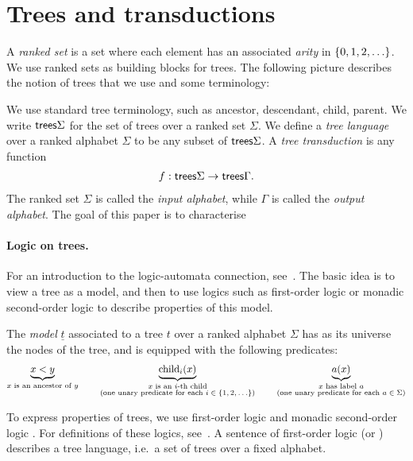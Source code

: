 \section{Trees and transductions}
\label{sec:trees-transductions}
A \emph{ranked set} is a set where each element has an associated \emph{arity} in $\{0,1,2,\ldots\}$. We use ranked sets as building blocks for trees. The following picture describes the notion of trees that we use and some terminology:

We use standard tree terminology, such as ancestor, descendant, child, parent. We write $\mathsf {trees} \Sigma$ for the set of trees over a ranked set $\Sigma$. 
We define a \emph{tree language} over a ranked alphabet $\Sigma$ to be any subset of $\mathsf {trees} \Sigma$. A \emph{tree transduction} is any function
\begin{align*}
f : \mathsf {trees} \Sigma \to \mathsf {trees} \Gamma.
\end{align*}
The ranked set $\Sigma$ is called the \emph{input alphabet}, while $\Gamma$ is called the \emph{output alphabet}. The goal of this paper is to characterise 


  
\paragraph*{Logic on trees.} For an introduction to the  logic-automata connection, see~\cite{thomas1997languages}. The basic idea is to view a tree as a model, and then to use logics such as first-order logic  or monadic second-order logic to describe properties of this model.

\begin{definition}\label{def:tree-model}
    The \emph{model} $\underline t$  associated to a  tree $t$ over a ranked alphabet $\Sigma$ has as its universe the nodes of the tree, and is equipped with the following predicates:
    \begin{align*}
        \underbrace{x < y}_{\substack{\text{$x$ is an ancestor of $y$}}} \qquad \underbrace{\mathrm{child}_i(x)}_{\substack{\text{$x$ is an $i$-th child}\\ \text{(one unary predicate for each $i\in \{1,2,\ldots\}$)}}}
        \qquad \underbrace{a(x)}_{\substack{\text{$x$ has label $a$}\\ \text{(one unary predicate for each $a \in \Sigma$)}}}
    \end{align*}
    \end{definition}
 To express properties of trees, we use first-order logic and monadic second-order logic \mso. For definitions of these logics, see~\cite[Section 3]{thomas1997languages}.
 A sentence of first-order logic (or \mso) describes a tree language, i.e.~a set of trees over a fixed alphabet.
 
